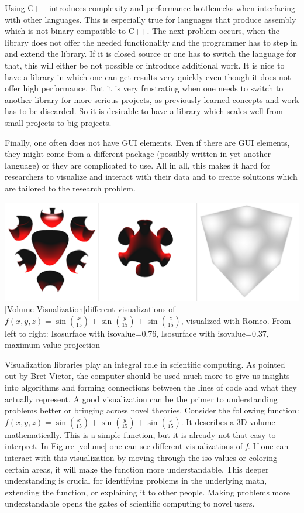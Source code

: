 Using C++ introduces complexity and performance bottlenecks when interfacing with other languages. This is especially true for languages that produce assembly which is not binary compatible to C++. 
The next problem occurs, when the library does not offer the needed functionality and the programmer has to step in and extend the library. 
If it is closed source or one has to switch the language for that, this will either be not possible or introduce additional work.
It is nice to have a library in which one can get results very quickly even though it does not offer high performance. 
But it is very frustrating when one needs to switch to another library for more serious projects, as previously learned concepts and work has to be discarded.
So it is desirable to have a library which scales well from small projects to big projects.

Finally, one often does not have GUI elements. 
Even if there are GUI elements, they might come from a different package (possibly written in yet another language) or they are complicated to use.
All in all, this makes it hard for researchers to visualize and interact with their data and to create solutions which are tailored to the research problem.

\vspace{1em}
\begin{minipage}{\linewidth}
    \centering
    \includegraphics[width=0.7\linewidth]{graphics/surfaces.png}
    [Volume Visualization]{different visualizations of $f(x,y,z)=\sin(\frac{x}{15})+\sin(\frac{y}{15})+\sin(\frac{z}{15})$, visualized with Romeo. From left to right: Isosurface with isovalue=0.76, Isosurface with isovalue=0.37, maximum value projection}
    \label{fig:volume}
\end{minipage}
\vspace{1em}

Visualization libraries play an integral role in scientific computing.
As pointed out by Bret Victor, the computer should be used much more to give us insights into algorithms and forming connections between the lines of code and what they actually represent\cite{BretVictorIventingOnPrinciple}.
A good visualization can be the primer to understanding problems better or bringing across novel theories.
Consider the following function: $f(x,y,z)=\sin(\frac{x}{15})+\sin(\frac{y}{15})+\sin(\frac{z}{15})$. 
It describes a 3D volume mathematically. 
This is a simple function, but it is already not that easy to interpret. In Figure \cref{volume} one can see different visualizations of \textit{f}.
If one can interact with this visualization by moving through the iso-values or coloring certain areas, it will make the function more understandable.
This deeper understanding is crucial for identifying problems in the underlying math, extending the function, or explaining it to other people. 
Making problems more understandable opens the gates of scientific computing to novel users.

